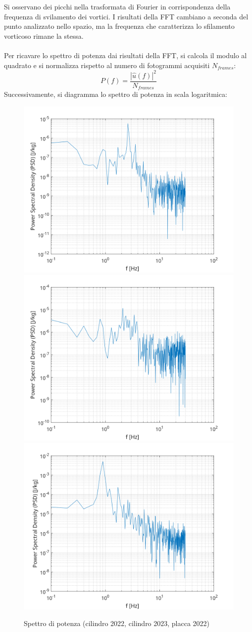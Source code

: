 \noindent Si osservano dei picchi nella trasformata di Fourier in corrispondenza della frequenza di svilamento dei vortici. I risultati della FFT cambiano a seconda del punto analizzato nello spazio, ma la frequenza che caratterizza lo sfilamento vorticoso rimane la stessa.\\\\
Per ricavare lo spettro di potenza dai risultati della FFT, si calcola il modulo al quadrato e si normalizza rispetto al numero di fotogrammi acquisiti $N_{frames}$:
\begin{equation*}
    P(f) = \frac{ \left|\hat u(f)\right|^2}{N_{frames}} 
\end{equation*}
\newpage
\noindent Successivamente, si diagramma lo spettro di potenza in scala logaritmica:
\begin{figure}[H]
    \centering
    \includegraphics[width=.55\textwidth]{images/11/PSD22.png}
    \includegraphics[width=.49\textwidth]{images/11/PSD23.png}
    \includegraphics[width=.49\textwidth]{images/11/PSD220.png}
    \caption{Spettro di potenza (cilindro 2022, cilindro 2023, placca 2022)}
\end{figure}

